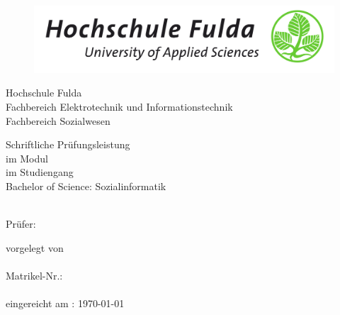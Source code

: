 \begin{titlepage}
\begin{figure}
  \centering
  \includegraphics[width=1.0\textwidth]{res/hs_fulda_logo.png}
\end{figure}
    \centering
    Hochschule Fulda \\    Fachbereich Elektrotechnik und Informations­technik \\ Fachbereich Sozialwesen
    \vspace{1.5cm}

    {\Huge \bfseries \titel \par}
    {\Large \itshape \untertitel \par}
    \vspace{2.5cm}

    Schriftliche Prüfungsleistung\\ im Modul
    \modulname\\
    im Studiengang\\ Bachelor of Science: Sozialinformatik \\
    \vspace{0.7cm}

    \semester\\

    \vspace{3cm}
    Prüfer: \pruefer\\

    \vfill

    vorgelegt von \\ \vorname\:\nachname \\ Matrikel-Nr.: \matrikelnummer \\ \emailadresse \\ eingereicht am : \today
\restoregeometry
\end{titlepage}
